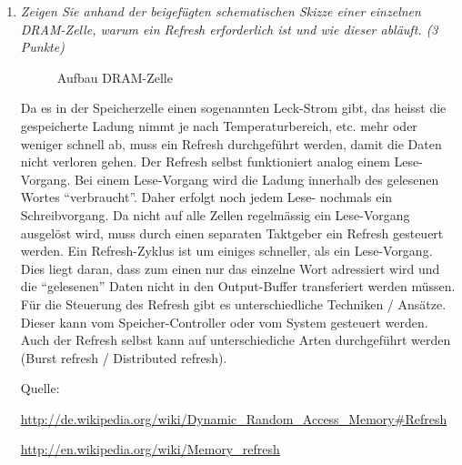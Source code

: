 \documentclass[10pt]{article}
\begin{document}
\begin{enumerate}[label=\alph*)]
	\item
		\textit{Zeigen Sie anhand der beigefügten schematischen Skizze einer einzelnen DRAM-Zelle, warum ein Refresh erforderlich ist und wie dieser abläuft. (3 Punkte)}
		
	\begin{figure}[htbp]
		\centering \leavevmode
		\epsfxsize=120pt
		\caption{Aufbau DRAM-Zelle}
	\end{figure}
Da es in der Speicherzelle einen sogenannten Leck-Strom gibt, das heisst die gespeicherte Ladung nimmt je nach Temperaturbereich, etc. mehr oder weniger schnell ab, muss ein Refresh durchgeführt werden, damit die Daten nicht verloren gehen.
Der Refresh selbst funktioniert analog einem Lese-Vorgang. Bei einem Lese-Vorgang wird die Ladung innerhalb des gelesenen Wortes "`verbraucht"'. Daher erfolgt noch jedem Lese- nochmals ein Schreibvorgang.
Da nicht auf alle Zellen regelmässig ein Lese-Vorgang ausgelöst wird, muss durch einen separaten Taktgeber ein Refresh gesteuert werden. Ein Refresh-Zyklus ist um einiges schneller, als ein Lese-Vorgang. Dies liegt daran, dass zum einen nur das einzelne Wort adressiert wird und die "`gelesenen"' Daten nicht in den Output-Buffer transferiert werden müssen.
Für die Steuerung des Refresh gibt es unterschiedliche Techniken / Ansätze. Dieser kann vom Speicher-Controller oder vom System gesteuert werden. Auch der Refresh selbst kann auf unterschiediche Arten durchgeführt werden (Burst refresh / Distributed refresh).
	
	Quelle:
	
		\url{http://de.wikipedia.org/wiki/Dynamic_Random_Access_Memory#Refresh}
		
		\url{http://en.wikipedia.org/wiki/Memory_refresh}
\end{enumerate}
\end{document}

